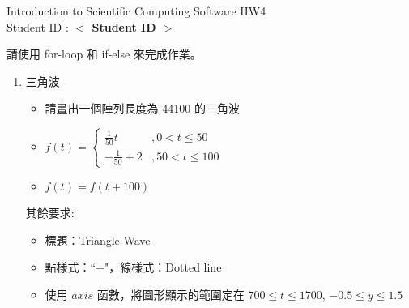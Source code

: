 \documentclass[12pt,a4paper]{article}
\newcommand{\placeholder}[1]{\textbf{$<$ #1 $>$}}
\newcommand{\idnumber}{\placeholder{Student ID}}
\begin{document}
\begin{CJK}{UTF8}{bsmi}
\begin{flushleft}Introduction to Scientific Computing Software HW4
\\Student ID : \idnumber{}\end{flushleft}

請使用 for-loop 和 if-else 來完成作業。
\begin{enumerate}
\item 三角波
\begin{itemize} 
\item 請畫出一個陣列長度為 44100 的三角波

\item $f(t)=\left\{\begin{array}{lc}\frac{1}{50}t&,0 < t\le50 \\ -\frac{1}{50}+2 &,50 < t \le 100\end{array}\right.$
\item $f(t)=f(t+100)$
\end{itemize}
其餘要求:
\begin{itemize}
\item 標題：Triangle Wave
\item 點樣式：``+"，線樣式：Dotted line
\item 使用 $axis$ 函數，將圖形顯示的範圍定在 $700 \le t \le 1700$, $-0.5 \le y \le 1.5$
\end{itemize}
\end{enumerate}
\end{CJK}
\end{document}
